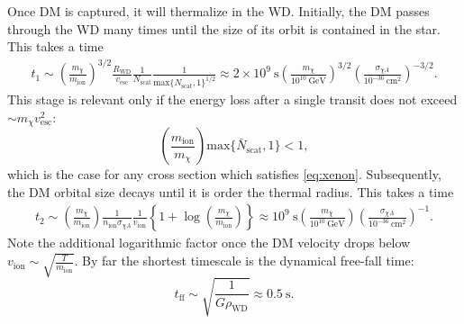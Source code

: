 \documentclass[preprintnumbers,amsmath,amssymb,prd,superscriptaddress]{revtex4}
\newcommand{\GeV}{\text{GeV}}
\newcommand{\cm}{\text{cm}}
\def\r{\right)}
\def\l{\left(}
\begin{document}
Once DM is captured, it will thermalize in the WD. 
Initially, the DM passes through the WD many times until the size of its orbit is contained in the star.
This takes a time
\begin{align}
  t_1 \sim \l \frac{m_\chi}{m_\text{ion}} \r^{3/2} 
  \frac{R_\text{WD}}{v_\text{esc}} \frac{1}{N_\text{scat}} 
  \frac{1}{\text{max}\{N_\text{scat}, 1\}^{1/2}} 
  \approx 2 \times 10^{9}~\text{s} \l \frac{m_\chi}{10^{10} ~\GeV} \r^{3/2} 
  \l \frac{\sigma_{\chi A}}{10^{-36} ~\cm^2} \r^{-3/2}.
\end{align}
This stage is relevant only if the energy loss after a single transit does not exceed $\sim m_\chi v_\text{esc}^2$:
\begin{equation}
\l \frac{m_\text{ion}}{m_\chi} \r \text{max}\{\bar{N}_\text{scat},1\} < 1,
\end{equation}
which is the case for any cross section which satisfies \eqref{eq:xenon}. 
Subsequently, the DM orbital size decays until it is order the thermal radius. 
This takes a time
\begin{align}
 t_2 \sim \l \frac{m_\chi}{m_\text{ion}} \r \frac{1}{n_\text{ion} \sigma_{\chi A}} \frac{1}{v_\text{ion}} \left \{ 1+\log \l \frac{m_\chi}{m_\text{ion}}\r \right \}
  \approx 10^9 ~\text{s} \l \frac{m_\chi}{10^{10} ~\GeV} \r \l \frac{\sigma_{\chi A}}{10^{-36} ~\cm^2} \r^{-1}.
\end{align}
Note the additional logarithmic factor once the DM velocity drops below $v_\text{ion} \sim \sqrt{\frac{T}{m_\text{ion}}}$. 
By far the shortest timescale is the dynamical free-fall time:
\begin{equation}
\label{eq:freefalltime}
t_\text{ff} \sim \sqrt{\frac{1}{G \rho_\text{WD}}} \approx 0.5 ~\text{s}.
\end{equation}
\end{document}
